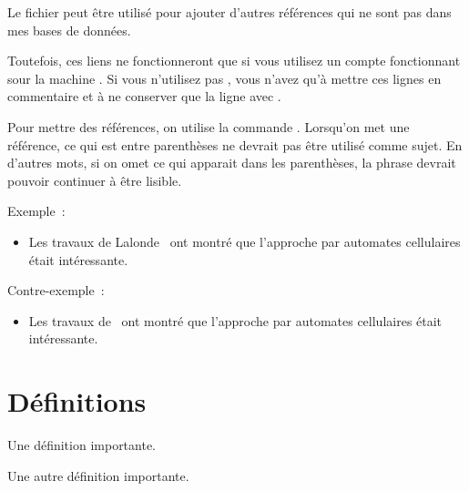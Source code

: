 Le fichier  peut \^etre utilis\'e pour ajouter
d'autres r\'ef\'erences qui ne sont pas dans mes bases de donn\'ees.

Toutefois, ces liens ne fonctionneront que si vous utilisez un compte
fonctionnant sour la machine .  Si vous n'utilisez pas
, vous n'avez qu'\`a mettre ces lignes en commentaire et
\`a ne conserver que la ligne avec .

Pour mettre des r\'ef\'erences, on utilise la commande
. Lorsqu'on met une r\'ef\'erence, ce qui est entre
parenth\`eses ne devrait pas \^etre utilis\'e comme sujet. En d'autres
mots, si on omet ce qui apparait dans les parenth\`eses, la phrase
devrait pouvoir continuer \`a \^etre lisible.

Exemple~: 
\begin{itemize}
\item Les travaux de Lalonde~\cite{Lalonde06url} ont montr\'e que
l'approche par automates cellulaires \'etait int\'eressante.
\end{itemize}

Contre-exemple~: 
\begin{itemize}
\item Les travaux de~\cite{Lalonde06url} ont montr\'e que l'approche
par automates cellulaires \'etait int\'eressante.
\end{itemize}



\section{D\'efinitions}

\begin{definition}
Une d\'efinition importante.
\end{definition}

\begin{definition}
Une autre d\'efinition importante.
\end{definition}
